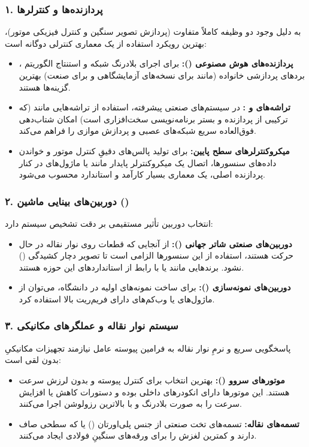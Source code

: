 \documentclass[a4paper, 10pt, twocolumn]{article}
\begin{document}
	\subsubsection*{۱. پردازنده‌ها و کنترلرها}
	به دلیل وجود دو وظیفه کاملاً متفاوت (پردازش تصویر سنگین و کنترل فیزیکی موتور)، بهترین رویکرد استفاده از یک معماری کنترلی دوگانه است:
	\begin{itemize}
		\item \textbf{پردازنده‌های هوش مصنوعی ():} برای اجرای بلادرنگ شبکه  و استنتاج الگوریتم ، بردهای پردازشی خانواده  (مانند  برای نسخه‌های آزمایشگاهی و  برای صنعت) بهترین گزینه‌ها هستند.
		\item \textbf{تراشه‌های  و :} در سیستم‌های صنعتی پیشرفته، استفاده از تراشه‌هایی مانند  (که ترکیبی از پردازنده  و بستر برنامه‌نویسی سخت‌افزاری است) امکان شتاب‌دهی فوق‌العاده سریع شبکه‌های عصبی و پردازش موازی را فراهم می‌کند.
		\item \textbf{میکروکنترلرهای سطح پایین:} برای تولید پالس‌های دقیقِ کنترل موتور و خواندن داده‌های سنسورها، اتصال یک میکروکنترلر پایدار مانند  یا ماژول‌های  در کنار پردازنده اصلی، یک معماری بسیار کارآمد و استاندارد محسوب می‌شود.
	\end{itemize}
	
	\subsubsection*{۲. دوربین‌های بینایی ماشین ()}
	انتخاب دوربین تأثیر مستقیمی بر دقت تشخیص سیستم دارد:
	\begin{itemize}
		\item \textbf{دوربین‌های صنعتی شاتر جهانی ():} از آنجایی که قطعات روی نوار نقاله در حال حرکت هستند، استفاده از این سنسورها الزامی است تا تصویر دچار کشیدگی () نشود. برندهایی مانند  یا  با رابط  از استانداردهای این حوزه هستند.
		\item \textbf{دوربین‌های نمونه‌سازی ():} برای ساخت نمونه‌های اولیه در دانشگاه، می‌توان از ماژول‌های  یا وب‌کم‌های دارای فریم‌ریت بالا استفاده کرد.
	\end{itemize}
	
	\subsubsection*{۳. سیستم نوار نقاله و عملگرهای مکانیکی}
	پاسخگویی سریع و نرمِ نوار نقاله به فرامین پیوسته عامل  نیازمند تجهیزات مکانیکیِ بدون لقی است:
	\begin{itemize}
		\item \textbf{موتورهای سروو ():} بهترین انتخاب برای کنترل پیوسته و بدون لرزش سرعت هستند. این موتورها دارای انکودرهای داخلی بوده و دستورات کاهش یا افزایش سرعت را به صورت بلادرنگ و با بالاترین رزولوشن اجرا می‌کنند.
		\item \textbf{تسمه‌های نقاله:} تسمه‌های تخت صنعتی از جنس پلی‌اورتان () یا  که سطحی صاف دارند و کمترین لغزش را برای ورقه‌های سنگینِ فولادی ایجاد می‌کنند.
	\end{itemize}
	
\end{document}
